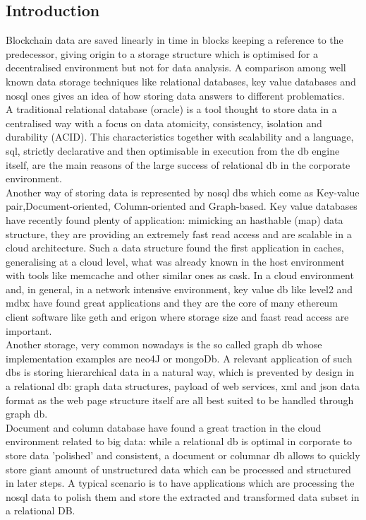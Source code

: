 \documentclass[11pt,a4paper,titlepage]{scrartcl}
\begin{document}
\subsection{Introduction} 
\label{bexp:lintro} 
Blockchain data are saved linearly in time in blocks keeping a reference to the predecessor, giving origin to a storage structure which is optimised for a decentralised environment but not for data analysis.  A comparison among  well known data storage techniques like  relational databases, key value databases and  nosql ones gives an idea of how storing data answers to different problematics.\\
A traditional relational database (oracle) is a tool thought to store data in a centralised way with a focus on data atomicity, consistency, isolation and durability (ACID). This characteristics together with scalability and a language, sql, strictly declarative and then optimisable in execution from the db engine itself, are the main reasons of the large success of relational db in the corporate environment. \\
Another way of storing data is represented by nosql dbs which come as Key-value pair,Document-oriented, Column-oriented and Graph-based.
Key value databases have recently found plenty of application: mimicking an hasthable (map) data structure, they are  providing an extremely fast  read access and are scalable in a cloud architecture. Such a data structure found the first application in caches, generalising at a cloud level, what was already known in the host environment with tools like memcache and other similar ones as cask. In a cloud environment and, in general, in a network intensive environment, key value db like level2 and mdbx have found great applications and they are the core of many ethereum client software like geth and erigon where storage size and faast read access are important. \\
Another storage, very common nowadays is the so called  graph db whose implementation examples are neo4J or mongoDb. A  relevant application of such dbs is storing hierarchical data in a natural way, which is prevented by  design in a relational db: graph data structures, payload of web services, xml and json data format as the web page structure itself are all best suited to be handled through graph db. \\
Document and column database have found a great traction in the cloud environment related to big data: while a relational db is optimal in corporate to store data 'polished' and consistent, a document or columnar db allows to quickly store giant amount of unstructured data which can be processed and structured in later steps. A typical scenario is to have applications which are processing the nosql data to polish them and store the extracted and transformed data subset in a relational DB.
\end{document}
